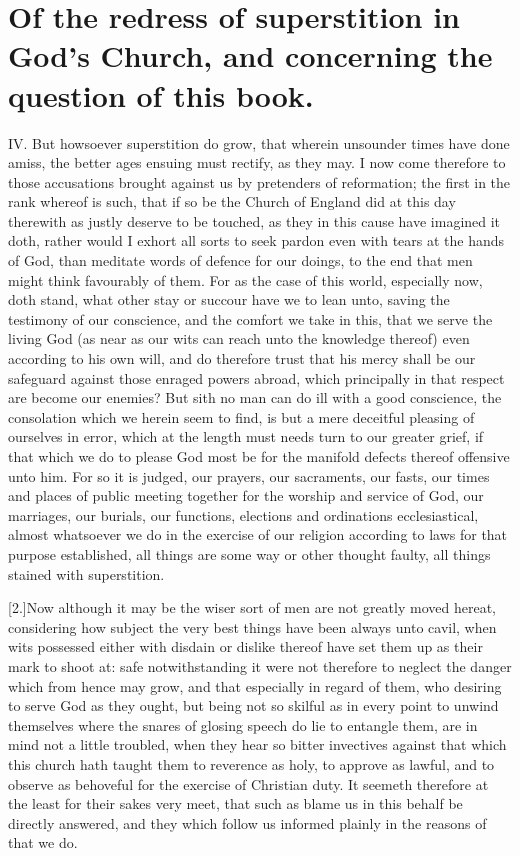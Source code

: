 \section*{Of the redress of superstition in God’s Church, and concerning the question of this book.}
IV. But howsoever superstition do grow, that wherein unsounder times have done amiss, the better ages ensuing must rectify, as they may. I now come therefore to those accusations brought against us by pretenders of reformation; the first in the rank whereof is such, that if so be the Church of England did at this day therewith as justly deserve to be touched, as they in this cause have imagined it doth, rather would I exhort all sorts to seek pardon even with tears at the hands of God, than meditate words of defence for our doings, to the end that men might think favourably of them. For as the case of this world, especially now, doth stand, what other stay or succour have we to lean unto, saving the testimony of our conscience, and the comfort we take in this, that we serve the living God (as near as our wits can reach unto the knowledge thereof) even according to his own will, and do therefore trust that his mercy shall be our safeguard against those enraged powers abroad, which principally in that respect are become our enemies? But sith no man can do ill with a good conscience, the consolation which we herein seem to find, is but a mere deceitful pleasing of ourselves in error, which at the length must needs turn to our greater grief, if that which we do to please God most be for the manifold defects thereof offensive unto him. For so it is judged, our prayers, our sacraments, our fasts, our times and places of public meeting together for the worship and service of God, our marriages, our burials, our functions, elections and ordinations ecclesiastical, almost whatsoever we do in the exercise of our religion according to laws for that purpose established, all things are some way or other thought faulty, all things stained with superstition.

[2.]Now although it may be the wiser sort of men are not greatly moved hereat, considering how subject the very best things have been always unto cavil, when wits possessed either with disdain or dislike thereof have set them up as their mark to shoot at: safe notwithstanding it were not therefore to  neglect the danger which from hence may grow,
 and that especially in regard of them, who desiring to serve God as they ought, but being not so skilful as in every point to unwind themselves where the snares of glosing speech do lie to entangle them, are in mind not a little troubled, when they hear so bitter invectives against that which this church hath taught them to reverence as holy, to approve as lawful, and to observe as behoveful for the exercise of Christian duty. It seemeth therefore at the least for their sakes very meet, that such as blame us in this behalf be directly answered, and they which follow us informed plainly in the reasons of that we do.

